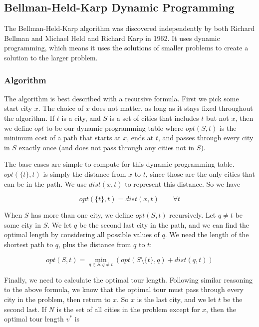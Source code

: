 \documentclass[11pt]{article}
\begin{document}
	\subsection{Bellman-Held-Karp Dynamic Programming}
	
	The Bellman-Held-Karp algorithm was discovered independently by both Richard Bellman \cite{Bellman} and Michael Held and Richard Karp \cite{HeldKarp} in 1962. It uses dynamic programming, which means it uses the solutions of smaller problems to create a solution to the larger problem.
	
	\subsubsection{Algorithm}
	
	The algorithm is best described with a recursive formula. First we pick some start city $x$. The choice of $x$ does not matter, as long as it stays fixed throughout the algorithm. If $t$ is a city, and $S$ is a set of cities that includes $t$ but not $x$, then we define $opt$ to be our dynamic programming table where $opt(S,t)$ is the minimum cost of a path that starts at $x$, ends at $t$, and passes through every city in $S$ exactly once (and does not pass through any cities not in $S$).
	
	The base cases are simple to compute for this dynamic programming table. $opt(\{ t \} , t)$ is simply the distance from $x$ to $t$, since those are the only cities that can be in the path. We use $dist(x,t)$ to represent this distance. So we have
	
	\[ opt(\{ t \}, t) = dist(x,t) \qquad \forall t \]
	
	When $S$ has more than one city, we define $opt(S,t)$ recursively. Let $q \neq t$ be some city in $S$. We let $q$ be the second last city in the path, and we can find the optimal length by considering all possible values of $q$. We need the length of the shortest path to $q$, plus the distance from $q$ to $t$:
	
	\[ opt(S,t) = \min_{q \in S, q \neq t} ( opt(S \setminus \{ t \} , q) + dist(q, t) ) \]
	
	Finally, we need to calculate the optimal tour length. Following similar reasoning to the above formula, we know that the optimal tour must pass through every city in the problem, then return to $x$. So $x$ is the last city, and we let $t$ be the second last. If $N$ is the set of all cities in the problem except for $x$, then the optimal tour length $v^*$ is
	
\end{document}
